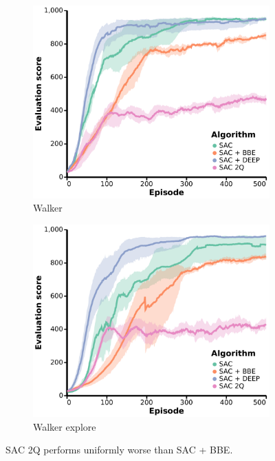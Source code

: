 \begin{figure}[h]
\begin{subfigure}[b]{0.24\textwidth}
        \centering
        \includegraphics[width=\textwidth]{figures/deep/neurips_SAC2Q_walker.pdf}
        \caption{Walker}
    \end{subfigure}
    \begin{subfigure}[b]{0.24\textwidth}
        \centering
        \includegraphics[width=\textwidth]{figures/deep/neurips_SAC2Q_walker_explore.pdf}
        \caption{Walker explore}
    \end{subfigure}
    \caption{SAC 2Q performs uniformly worse than SAC + BBE.}
\end{figure}
\printendnotes
